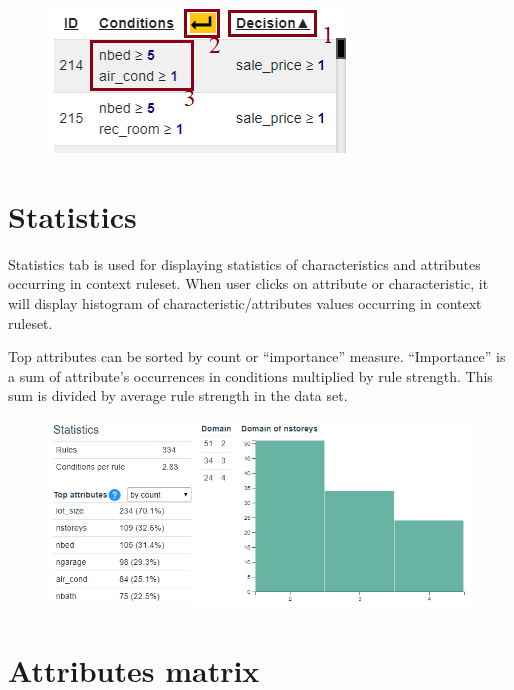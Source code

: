 \documentclass[12pt]{article}
\begin{document}
\begin{figure}[H]
    \centering
    \includegraphics{figures/B-list.png}
\end{figure}

\section{Statistics}

Statistics tab is used for displaying statistics of characteristics and attributes occurring in context ruleset. When user clicks on attribute or characteristic, it will display histogram of characteristic/attributes values occurring in context ruleset.

Top attributes can be sorted by count or ``importance'' measure. ``Importance'' is a sum of attribute's occurrences in conditions multiplied by rule strength. This sum is divided by average rule strength in the data set.

\begin{figure}[H]
    \centering
    \includegraphics[width=\textwidth]{figures/B-statistics.png}
\end{figure}

\section{Attributes matrix}
\end{document}
